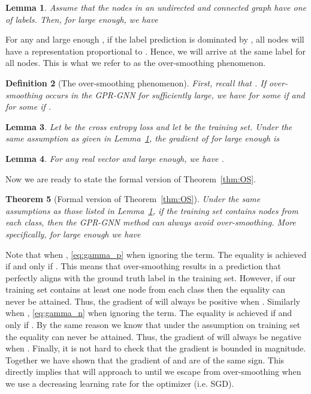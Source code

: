 \documentclass{article} \usepackage{iclr2021_conference,times}
\newtheorem{theorem}{Theorem}[section]
\newtheorem{definition}[theorem]{Definition}
\newtheorem{lemma}[theorem]{Lemma}
\begin{document}
\begin{lemma}\label{lma:main1}
 Assume that the nodes in an undirected and connected graph  have one of  labels. Then, for  large enough, we have
 
\end{lemma}
For any  and large enough , if the label prediction is dominated by , all nodes will have a representation proportional to . Hence, we will arrive at the same label for all nodes. This is what we refer to as the over-smoothing phenomenon.

\begin{definition}[The over-smoothing phenomenon]\label{def:oversmoothing}
First, recall that . If over-smoothing occurs in the GPR-GNN for  sufficiently large, we have  for some  if  and  for some  if .
\end{definition}

\begin{lemma}\label{lma:main2}
 Let  be the cross entropy loss and let  be the training set. Under the same assumption as given in Lemma~\ref{lma:main1}, the gradient of  for  large enough is 
\end{lemma}
\begin{lemma}\label{lma:softmax2argmax}
  For any real vector  and  large enough, we have .
\end{lemma}

Now we are ready to state the formal version of Theorem~\ref{thm:OS}.
\begin{theorem}[Formal version of Theorem~\ref{thm:OS}]
  Under the same assumptions as those listed in Lemma~\ref{lma:main1}, if the training set contains nodes from each class, then the GPR-GNN method can always avoid over-smoothing. More specifically, for  large enough we have
 
\end{theorem}

Note that when , \eqref{eq:gamma_p}  when ignoring the  term. The equality is achieved if and only if . This means that over-smoothing results in a prediction that perfectly aligns with the ground truth label in the training set. However, if our training set contains at least one node from each class then the equality can never be attained. Thus, the gradient of  will always be positive when . Similarly when , \eqref{eq:gamma_n}  when ignoring the  term. The equality is achieved if and only if . By the same reason we know that under the assumption on training set the equality can never be attained. Thus, the gradient of  will always be negative when . Finally, it is not hard to check that the gradient is bounded in magnitude. Together we have shown that the gradient of  and  are of the same sign. This directly implies that  will approach to  until we escape from over-smoothing when we use a decreasing learning rate for the optimizer (i.e. SGD).
\end{document}
